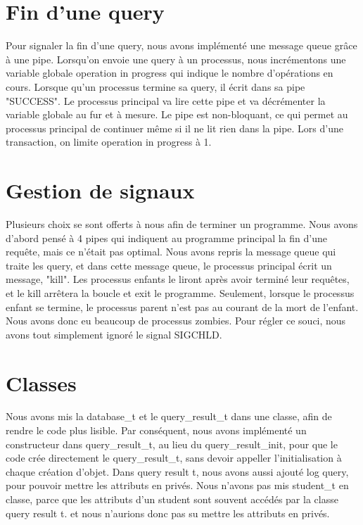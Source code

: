 \documentclass[utf8]{article}
\begin{document}
\section{Fin d'une query}

\indent{}
\par
Pour signaler la fin d'une query, nous avons implémenté une message queue grâce à une pipe. Lorsqu'on envoie 
une query à un processus, nous incrémentons une variable globale operation in progress qui indique le nombre d'opérations en cours.
Lorsque qu'un processus termine sa query, il écrit dans sa pipe "SUCCESS". Le processus principal va lire cette pipe et va décrémenter
la variable globale au fur et à mesure. Le pipe est non-bloquant, ce qui permet au processus principal de continuer
même si il ne lit rien dans la pipe. Lors d'une transaction, on limite operation in progress à 1.

\section{Gestion de signaux}
\indent{}
\par
Plusieurs choix se sont offerts à nous afin de terminer un programme. Nous avons d'abord pensé à 4 pipes qui indiquent au programme principal 
la fin d'une requête, mais ce n'était pas optimal.
Nous avons repris la message queue qui traite les query, et dans 
cette message queue, le processus principal écrit un message, "kill". Les processus enfants le liront après avoir terminé leur requêtes,
et le kill arrêtera la boucle et exit le programme.
Seulement, lorsque le processus enfant se termine, le processus parent n'est pas au courant de la mort de l'enfant. Nous avons donc eu 
beaucoup de processus zombies. Pour régler ce souci, nous avons tout simplement ignoré le signal SIGCHLD.


\section{Classes}
\indent{}
\par
Nous avons mis la database\_t et le query\_result\_t dans une classe, afin de rendre le code plus lisible. Par conséquent,
nous avons implémenté un constructeur dans query\_result\_t, au lieu du query\_result\_init, pour que le code
crée directement le query\_result\_t, sans devoir appeller l'initialisation à chaque création d'objet.
Dans query result t, nous avons aussi ajouté log query, pour pouvoir mettre les attributs en privés.
Nous n'avons pas mis student\_t en classe, parce que les attributs d'un student sont souvent accédés par la classe query result t.
et nous n'aurions donc pas su mettre les attributs en privés.
\end{document}
